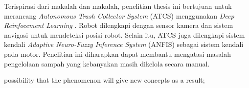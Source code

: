  Terispirasi dari makalah \cite{Bai2018} dan makalah\cite{Kong2009,Michael2008,Wang2008,Arai2019}, 
 penelitian thesis ini bertujuan untuk merancang \textit{Autonomous Trash Collector System} (ATCS) menggunakan \textit{Deep Reinfocement Learning}  \cite{Mustafa2019}. Robot dilengkapi dengan sensor kamera dan sistem navigasi untuk mendeteksi posisi robot. Selain itu, ATCS juga dilengkapi sistem kendali \textit{Adaptive Neuro-Fuzzy Inference System} (ANFIS) sebagai sistem kendali pada motor\cite{Saputra2019}. Penelitian ini diharapkan dapat membantu mengatasi masalah pengelolaan sampah yang kebanyakan masih dikelola secara manual.




possibility that the phenomenon will give new concepts as a result; 







